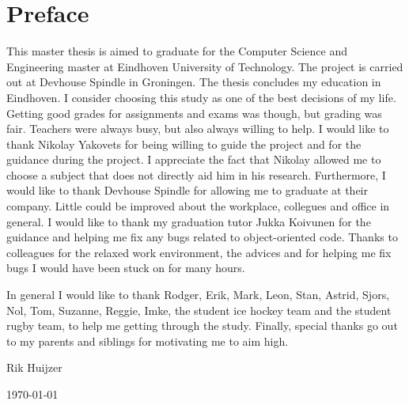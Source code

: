 \chapter*{Preface}
\label{ch:preface}

This master thesis is aimed to graduate for the Computer Science and Engineering master at Eindhoven University of Technology.
The project is carried out at Devhouse Spindle in Groningen.
The thesis concludes my education in Eindhoven.
I consider choosing this study as one of the best decisions of my life.
Getting good grades for assignments and exams was though, but grading was fair.
Teachers were always busy, but also always willing to help.
I would like to thank Nikolay Yakovets for being willing to guide the project and for the guidance during the project.
I appreciate the fact that Nikolay allowed me to choose a subject that does not directly aid him in his research.
Furthermore, I would like to thank Devhouse Spindle for allowing me to graduate at their company.
Little could be improved about the workplace, collegues and office in general.
I would like to thank my graduation tutor Jukka Koivunen for the guidance and helping me fix any bugs related to object-oriented code.
Thanks to colleagues for the relaxed work environment, the advices and for helping me fix bugs I would have been stuck on for many hours.

In general I would like to thank Rodger, Erik, Mark, Leon, Stan, Astrid, Sjors, Nol, Tom, Suzanne, Reggie, Imke, the student ice hockey team and the student rugby team, to help me getting through the study.
Finally, special thanks go out to my parents and siblings for motivating me to aim high.


\vspace*{5mm}
Rik Huijzer

\today